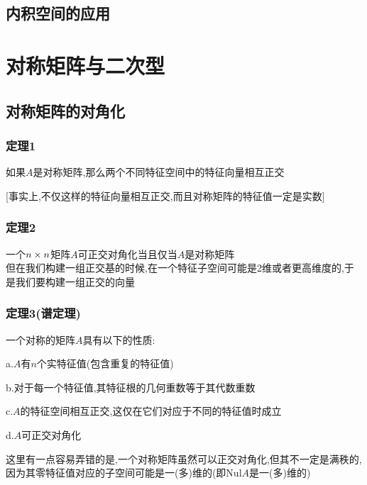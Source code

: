 \documentclass{article}
\newcommand{\nul}{\text{Nul}}
\begin{document}
\begin{CJK}{UTF8}{gkai}
\subsection{内积空间的应用}

\newpage
\section{对称矩阵与二次型}

\subsection{对称矩阵的对角化}
\subsubsection{定理1}
如果$A$是对称矩阵,那么两个不同特征空间中的特征向量相互正交

[事实上,不仅这样的特征向量相互正交,而且对称矩阵的特征值一定是实数]
\subsubsection{定理2}
一个$n\times n$矩阵$A$可正交对角化当且仅当$A$是对称矩阵\\

但在我们构建一组正交基的时候,在一个特征子空间可能是2维或者更高维度的,于是我们要构建一组正交的向量

\subsubsection{定理3(谱定理)}
一个对称的矩阵$A$具有以下的性质:

a.$A$有$n$个实特征值(包含重复的特征值)

b.对于每一个特征值,其特征根的几何重数等于其代数重数

c.$A$的特征空间相互正交,这仅在它们对应于不同的特征值时成立

d.$A$可正交对角化

这里有一点容易弄错的是,一个对称矩阵虽然可以正交对角化,但其不一定是满秩的,因为其零特征值对应的子空间可能是一(多)维的(即$\nul A$是一(多)维的)

\end{CJK}
\end{document}
